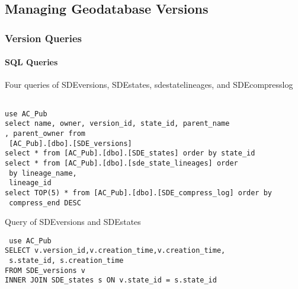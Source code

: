 %
%
%
%
% 
\subsection{Managing Geodatabase Versions}
\medskip

\subsubsection[Version Queries]{\Large Version Queries}

\paragraph[SQL Queries]{SQL Queries \texorpdfstring{\\}{}}
Four queries of SDEversions, SDEstates, sdestatelineages, and SDEcompresslog

\begin{verbatim}

use AC_Pub
select name, owner, version_id, state_id, parent_name
, parent_owner from
 [AC_Pub].[dbo].[SDE_versions]
select * from [AC_Pub].[dbo].[SDE_states] order by state_id
select * from [AC_Pub].[dbo].[sde_state_lineages] order
 by lineage_name,
 lineage_id
select TOP(5) * from [AC_Pub].[dbo].[SDE_compress_log] order by
 compress_end DESC
 \end{verbatim}
Query of SDEversions and SDEstates

 \begin{verbatim}
 use AC_Pub
SELECT v.version_id,v.creation_time,v.creation_time,
 s.state_id, s.creation_time
FROM SDE_versions v
INNER JOIN SDE_states s ON v.state_id = s.state_id

\end{verbatim}
\clearpage
